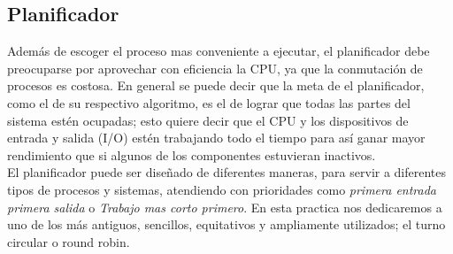 \documentclass[12pt]{article}
\begin{document}
\subsection{Planificador}
Además de escoger el proceso mas conveniente a ejecutar, el planificador debe preocuparse por aprovechar con eficiencia la CPU, ya que la conmutación de procesos es costosa. En general se puede decir que la meta de el planificador, como el de su respectivo algoritmo, es el de lograr que todas las partes del sistema estén ocupadas; esto quiere decir que el CPU y los dispositivos de entrada y salida (I/O) estén trabajando todo el tiempo para así ganar mayor rendimiento que si algunos de los componentes estuvieran inactivos.\\
El planificador puede ser diseñado de diferentes maneras, para servir a diferentes tipos de procesos y sistemas, atendiendo con prioridades como \emph{primera entrada primera salida } o \emph{Trabajo mas corto primero}. En esta practica nos dedicaremos a uno de los más antiguos, sencillos, equitativos y ampliamente utilizados; el turno circular o round robin.
\end{document}
